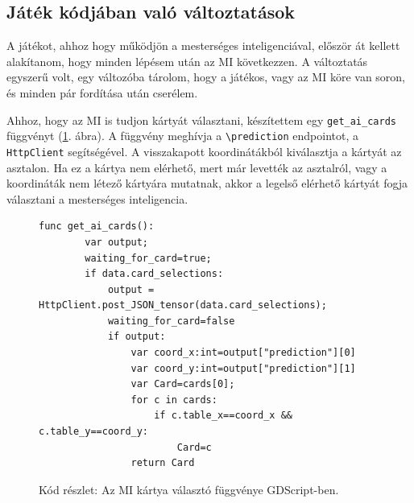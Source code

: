 \subsection{Játék kódjában való változtatások}

A játékot, ahhoz hogy működjön a mesterséges inteligenciával, először át kellett alakítanom, hogy minden lépésem után az MI következzen. A változtatás egyszerű volt, egy változóba tárolom, hogy a játékos, vagy az MI köre van soron, és minden pár fordítása után cserélem. 

Ahhoz, hogy az MI is tudjon kártyát választani, készítettem egy \lstinline{get_ai_cards} függvényt (\ref{code:get_ai_card}. ábra). A függvény meghívja a \lstinline{\prediction} endpointot, a \lstinline{HttpClient} segítségével. A visszakapott koordinátákból kiválasztja a kártyát az asztalon. 
Ha ez a kártya nem elérhető, mert már levették az asztalról, vagy a koordináták nem létező kártyára mutatnak, akkor a legelső elérhető kártyát fogja választani a mesterséges inteligencia. 

\begin{figure}[H]
    \centering
    \begin{lstlisting}[language=GDScript]
func get_ai_cards():
        var output;
        waiting_for_card=true;
        if data.card_selections:
            output = HttpClient.post_JSON_tensor(data.card_selections);
            waiting_for_card=false
            if output:
                var coord_x:int=output["prediction"][0]
                var coord_y:int=output["prediction"][1]
                var Card=cards[0];
                for c in cards:
                    if c.table_x==coord_x && c.table_y==coord_y:
                        Card=c
                return Card
    \end{lstlisting}
    \caption{Kód részlet: Az MI kártya választó függvénye GDScript-ben.}
    \label{code:get_ai_card}
\end{figure}
